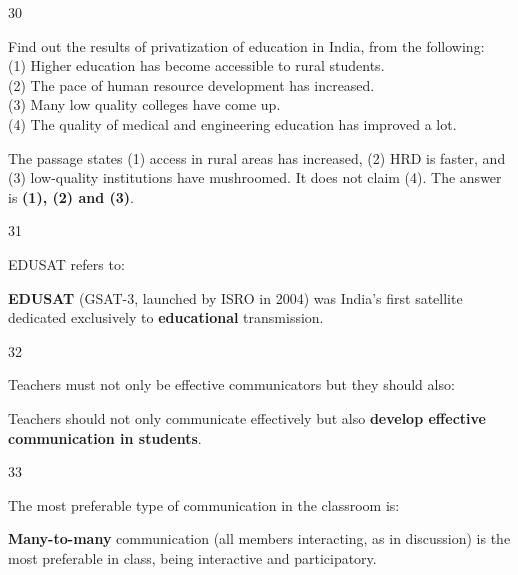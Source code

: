 \begin{question}{30}
{Find out the results of privatization of education in India, from the following:\\
(1) Higher education has become accessible to rural students.\\
(2) The pace of human resource development has increased.\\
(3) Many low quality colleges have come up.\\
(4) The quality of medical and engineering education has improved a lot.\par}
\begin{explain}
The passage states (1) access in rural areas has increased, (2) HRD is faster, and (3) low-quality institutions have mushroomed. It does not claim (4). The answer is \textbf{(1), (2) and (3)}.
\end{explain}
\end{question}

\begin{question}{31}
{EDUSAT refers to:\par}
\begin{explain}
\textbf{EDUSAT} (GSAT-3, launched by ISRO in 2004) was India's first satellite dedicated exclusively to \textbf{educational} transmission.
\end{explain}
\end{question}

\begin{question}{32}
{Teachers must not only be effective communicators but they should also:\par}
\begin{explain}
Teachers should not only communicate effectively but also \textbf{develop effective communication in students}.
\end{explain}
\end{question}

\begin{question}{33}
{The most preferable type of communication in the classroom is:\par}
\begin{explain}
\textbf{Many-to-many} communication (all members interacting, as in discussion) is the most preferable in class, being interactive and participatory.
\end{explain}
\end{question}

